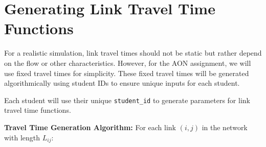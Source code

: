 \documentclass{rapportCS} %
\begin{document}
\newpage

\section{Generating Link Travel Time Functions}

For a realistic simulation, link travel times should not be static but rather depend on the flow or other characteristics. However, for the AON assignment, we will use fixed travel times for simplicity. These fixed travel times will be generated algorithmically using student IDs to ensure unique inputs for each student.

Each student will use their unique \texttt{student\_id} to generate parameters for link travel time functions.

\textbf{Travel Time Generation Algorithm:}
For each link \( (i, j) \) in the network with length \( L_{ij} \):
\end{document}
